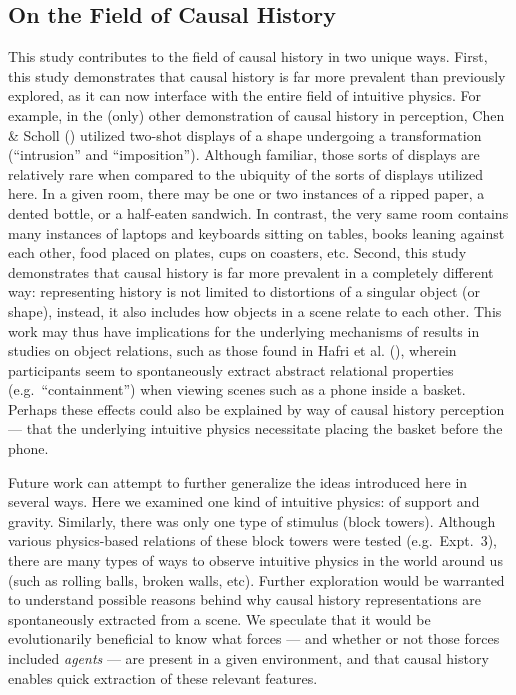 \subsection{On the Field of Causal History}
This study contributes to the field of causal history in two unique ways.  First, this study demonstrates that causal history is far more prevalent than previously explored, as it can now interface with the entire field of intuitive physics.  For example, in the (only) other demonstration of causal history in perception, Chen \& Scholl (\citeyear{chen_perception_2016}) utilized two-shot displays of a shape undergoing a transformation (“intrusion” and “imposition”).  Although familiar, those sorts of displays are relatively rare when compared to the ubiquity of the sorts of displays utilized here.  In a given room, there may be one or two instances of a ripped paper, a dented bottle, or a half-eaten sandwich.  In contrast, the very same room contains many instances of laptops and keyboards sitting on tables, books leaning against each other, food placed on plates, cups on coasters, etc.   Second, this study demonstrates that causal history is far more prevalent in a completely different way: representing history is not limited to distortions of a singular object (or shape), instead, it also includes how objects in a scene relate to each other.  This work may thus have implications for the underlying mechanisms of results in studies on object relations, such as those found in Hafri et al. (\citeyear{hafri_phone_2024}), wherein participants seem to spontaneously extract abstract relational properties (e.g.~“containment”) when viewing scenes such as a phone inside a basket.  Perhaps these effects could also be explained by way of causal history perception --- that the underlying intuitive physics necessitate placing the basket before the phone.

Future work can attempt to further generalize the ideas introduced here in several ways.  Here we examined one kind of intuitive physics: of support and gravity.  Similarly, there was only one type of stimulus (block towers).  Although various physics-based relations of these block towers were tested (e.g.~Expt.~3), there are many types of ways to observe intuitive physics in the world around us (such as rolling balls, broken walls, etc).  Further exploration would be warranted to understand possible reasons behind why causal history representations are spontaneously extracted from a scene.  We speculate that it would be evolutionarily beneficial to know what forces --- and whether or not those forces included \textit{agents} --- are present in a given environment, and that causal history enables quick extraction of these relevant features. 

